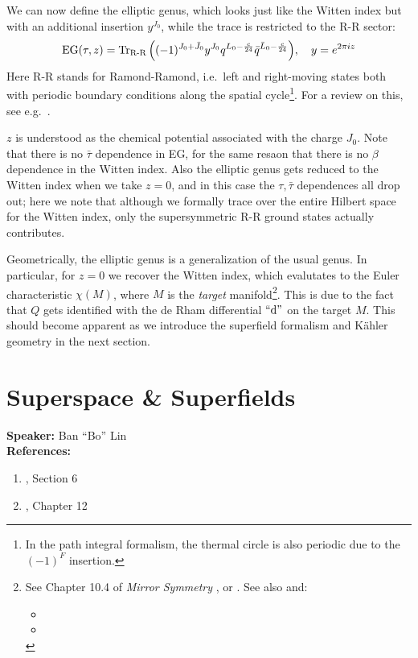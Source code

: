\documentclass[a4paper
	,10pt
]{article}
\newcommand{\speaker}[1]{\noindent\textbf{Speaker:} #1}
\newcommand{\references}[1]{\noindent\textbf{References:} #1}
\begin{document}
	We can now define the elliptic genus, which looks just like the Witten index but with an additional insertion $y^{J_0}$, while the trace is restricted to the R-R sector:
	\begin{equation}
		\mrm{EG}(\tau,z)
		= \Tr_{\text{R-R}} \pqty{
			(-1)^{J_0 + \bar{J}_0}
			y^{J_0}
			q^{L_0 - \frac{c}{24}}
			\bar{q}^{\bar{L}_0 - \frac{c}{24}}
		}, \quad y = e^{2\pi i z}
	\end{equation}
	Here R-R stands for Ramond-Ramond, i.e.\ left and right-moving states both with periodic boundary conditions along the spatial cycle\footnote{
		In the path integral formalism, the thermal circle is also periodic due to the $(-1)^F$ insertion. 
	}. 
	For a review on this, see e.g.~\cite{Anagiannis:2018jqf}. 
	
	$z$ is understood as the chemical potential associated with the charge $J_0$. Note that there is no $\bar{\tau}$ dependence in EG, for the same resaon that there is no $\beta$ dependence in the Witten index. Also the elliptic genus gets reduced to the Witten index when we take $z = 0$, and in this case the $\tau,\bar{\tau}$ dependences all drop out; here we note that although we formally trace over the entire Hilbert space for the Witten index, only the supersymmetric R-R ground states actually contributes. 
	
	Geometrically, the elliptic genus is a generalization of the usual genus. In particular, for $z = 0$ we recover the Witten index, which evalutates to the Euler characteristic $\chi(M)$, where $M$ is the \textit{target} manifold\footnote{
		See Chapter 10.4 of \textit{Mirror Symmetry} \cite{Hori:2003ic}, or \textcite{Witten:1982df}. See also \cite{MauricioStuff} and:
		\begin{itemize}[
			topsep=.5ex,noitemsep,
			leftmargin=4em
		]
		\item {}
		\item {}
		\end{itemize}
	}. This is due to the fact that $Q$ gets identified with the de Rham differential $\text{``$\dd$''}$ on the target $M$. This should become apparent as we introduce the superfield formalism and K\"ahler geometry in the next section. 
	
	
	
	
\section{Superspace \& Superfields}
	\speaker{Ban ``Bo'' Lin}\\
	\references{
	\begin{enumerate}[noitemsep,topsep=0pt]
	\item \textcite{Argyres:1996abc}, Section 6
	\item \citetitle{Hori:2003ic} \cite{Hori:2003ic}, Chapter 12
	\end{enumerate}
	}\vspace{.5\baselineskip}
	
\end{document}
